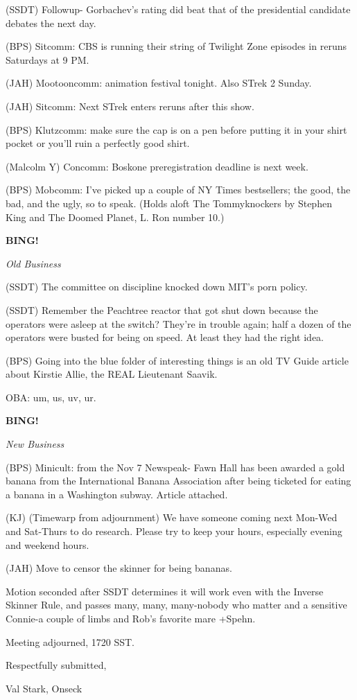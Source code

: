 \documentclass[12pt]{article}
\newcommand{\bing}{{\bf BING!} }
\newcommand{\goto}[1]{\bing \vskip 12pt \centerline{{\em{#1}}}}
\begin{document}
(SSDT) Followup- Gorbachev's rating did beat that of the presidential candidate debates the next day.

(BPS) Sitcomm: CBS is running their string of Twilight Zone episodes in reruns Saturdays at 9 PM.

(JAH) Mootooncomm: animation festival tonight. Also STrek 2 Sunday.

(JAH) Sitcomm: Next STrek enters reruns after this show.

(BPS) Klutzcomm: make sure the cap is on a pen before putting it in your shirt pocket or you'll ruin a perfectly good shirt.

(Malcolm Y) Concomm: Boskone preregistration deadline is next week.

(BPS) Mobcomm: I've picked up a couple of NY Times bestsellers; the good, the bad, and the ugly, so to speak. (Holds aloft The Tommyknockers by Stephen King and The Doomed Planet, L. Ron number 10.)

\goto{Old Business}

(SSDT) The committee on discipline knocked down MIT's porn policy.

(SSDT) Remember the Peachtree reactor that got shut down because the operators were asleep at the switch? They're in trouble again; half a dozen of the operators were busted for being on speed. At least they had the right idea.

(BPS) Going into the blue folder of interesting things is an old TV Guide article about Kirstie Allie, the REAL Lieutenant Saavik.

OBA: um, us, uv, ur.

\goto{New Business}

(BPS) Minicult: from the Nov 7 Newspeak- Fawn Hall has been awarded a gold banana from the International Banana Association after being ticketed for eating a banana in a Washington subway. Article attached.

(KJ) (Timewarp from adjournment) We have someone coming next Mon-Wed and Sat-Thurs to do research. Please try to keep your hours, especially evening and weekend hours.

(JAH) Move to censor the skinner for being bananas.

Motion seconded after SSDT determines it will work even with the Inverse Skinner Rule, and passes many, many, many-nobody who matter and a sensitive Connie-a couple of limbs and Rob's favorite mare +Spehn.

\vspace{12pt}

\noindent
Meeting adjourned, 1720 SST.

\vspace{18pt}

\centerline{Respectfully submitted,}
\centerline{Val Stark, Onseck}
\end{document}
